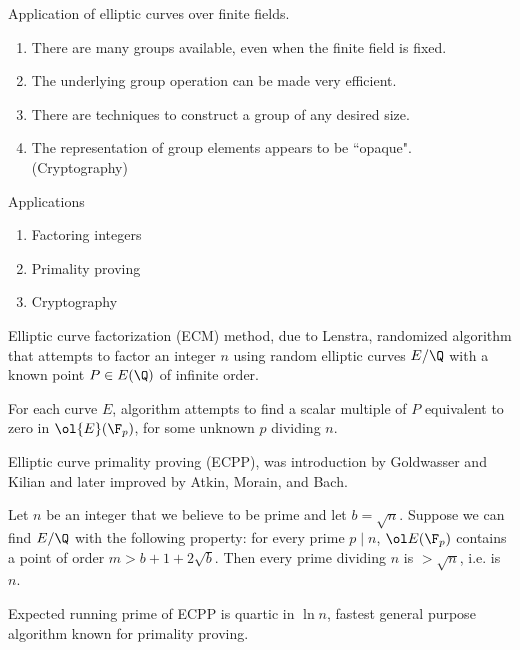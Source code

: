 Application of elliptic curves over finite fields.
\begin{enumerate}
\item
There are many groups available, even when the finite field is fixed.
\item The underlying group operation can be made very efficient.
\item There are techniques to construct a group of any desired size.
\item The representation of group elements appears to be ``opaque". (Cryptography)
\end{enumerate}
Applications
\begin{enumerate}
\item
Factoring integers
\item
Primality proving
\item
Cryptography
\end{enumerate}
Elliptic curve factorization (ECM) method, due to Lenstra, randomized algorithm that attempts to factor an integer $n$ using random elliptic curves $E/\Q$ with a known point $P\in E(\Q)$ of infinite order.

For each curve $E$, algorithm attempts to find a scalar multiple of $P$ equivalent to zero in $\ol{E}(\F_p)$, for some unknown $p$ dividing $n$.

Elliptic curve primality proving (ECPP), was introduction by Goldwasser and Kilian and later improved by Atkin, Morain, and Bach.

Let $n$ be an integer that we believe to be prime and let $b=\sqrt n$. Suppose we can find $E/\Q$ with the following property: for every prime $p\mid n$, $\ol E(\F_p)$ contains a point of order $m>b+1+2\sqrt b$. Then every prime dividing $n$ is $>\sqrt n$, i.e. is $n$.

Expected running prime of ECPP is quartic in $\ln n$, fastest general purpose algorithm known for primality proving.

